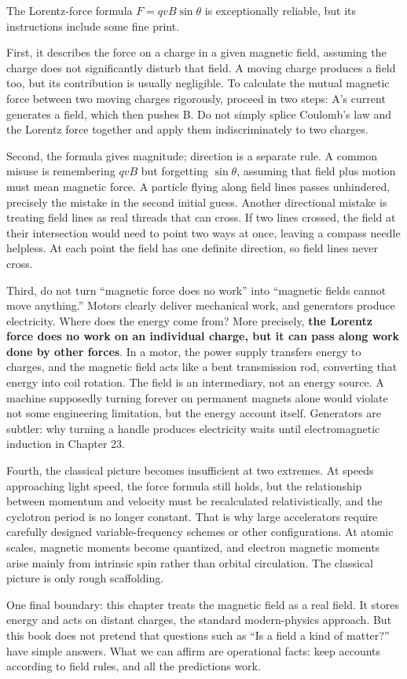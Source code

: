 
\begin{mainline}
The Lorentz-force formula \(F=qvB\sin\theta\) is exceptionally reliable, but its instructions include some fine print.

First, it describes the force on a charge in a given magnetic field, assuming the charge does not significantly disturb that field. A moving charge produces a field too, but its contribution is usually negligible. To calculate the mutual magnetic force between two moving charges rigorously, proceed in two steps: A's current generates a field, which then pushes B. Do not simply splice Coulomb's law and the Lorentz force together and apply them indiscriminately to two charges.

Second, the formula gives magnitude; direction is a separate rule. A common misuse is remembering \(qvB\) but forgetting \(\sin\theta\), assuming that field plus motion must mean magnetic force. A particle flying along field lines passes unhindered, precisely the mistake in the second initial guess. Another directional mistake is treating field lines as real threads that can cross. If two lines crossed, the field at their intersection would need to point two ways at once, leaving a compass needle helpless. At each point the field has one definite direction, so field lines never cross.

Third, do not turn ``magnetic force does no work'' into ``magnetic fields cannot move anything.'' Motors clearly deliver mechanical work, and generators produce electricity. Where does the energy come from? More precisely, \textbf{the Lorentz force does no work on an individual charge, but it can pass along work done by other forces}. In a motor, the power supply transfers energy to charges, and the magnetic field acts like a bent transmission rod, converting that energy into coil rotation. The field is an intermediary, not an energy source. A machine supposedly turning forever on permanent magnets alone would violate not some engineering limitation, but the energy account itself. Generators are subtler: why turning a handle produces electricity waits until electromagnetic induction in Chapter 23.

Fourth, the classical picture becomes insufficient at two extremes. At speeds approaching light speed, the force formula still holds, but the relationship between momentum and velocity must be recalculated relativistically, and the cyclotron period is no longer constant. That is why large accelerators require carefully designed variable-frequency schemes or other configurations. At atomic scales, magnetic moments become quantized, and electron magnetic moments arise mainly from intrinsic spin rather than orbital circulation. The classical picture is only rough scaffolding.

One final boundary: this chapter treats the magnetic field as a real field. It stores energy and acts on distant charges, the standard modern-physics approach. But this book does not pretend that questions such as ``Is a field a kind of matter?'' have simple answers. What we can affirm are operational facts: keep accounts according to field rules, and all the predictions work.
\end{mainline}


